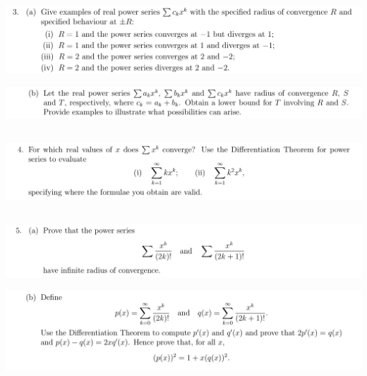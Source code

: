 \documentclass[12pt]{article}
\begin{document}
\newpage
\subsection{}
\begin{mdframed}
\includegraphics[width=400pt]{img/analysis--oxford-M2-I-7-3-a.png}
\end{mdframed}

\begin{mdframed}
\includegraphics[width=400pt]{img/analysis--oxford-M2-I-7-3-b.png}
\end{mdframed}

\newpage
\subsection{}
\begin{mdframed}
\includegraphics[width=400pt]{img/analysis--oxford-M2-I-7-4.png}
\end{mdframed}

\newpage
\subsection{}
\begin{mdframed}
\includegraphics[width=400pt]{img/analysis--oxford-M2-I-7-5.png}
\end{mdframed}

\begin{mdframed}
\includegraphics[width=400pt]{img/analysis--oxford-M2-I-7-5-b.png}
\end{mdframed}
\end{document}
